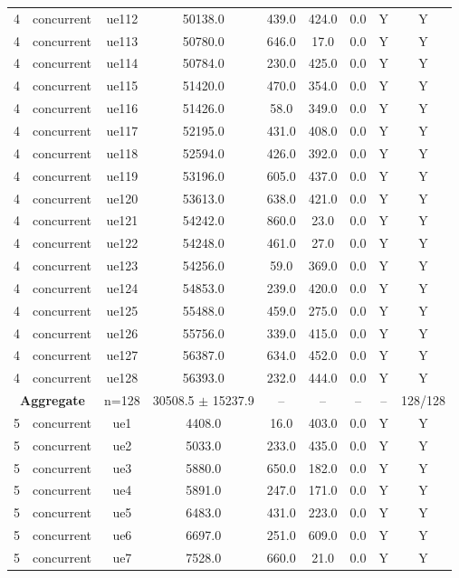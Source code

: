 \begin{table}[ht]
\begin{tabular}{|c|c|c|c|c|c|c|c|c|}
4 & concurrent & ue112 & 50138.0 & 439.0 & 424.0 & 0.0 & Y & Y \\
4 & concurrent & ue113 & 50780.0 & 646.0 & 17.0 & 0.0 & Y & Y \\
4 & concurrent & ue114 & 50784.0 & 230.0 & 425.0 & 0.0 & Y & Y \\
4 & concurrent & ue115 & 51420.0 & 470.0 & 354.0 & 0.0 & Y & Y \\
4 & concurrent & ue116 & 51426.0 & 58.0 & 349.0 & 0.0 & Y & Y \\
4 & concurrent & ue117 & 52195.0 & 431.0 & 408.0 & 0.0 & Y & Y \\
4 & concurrent & ue118 & 52594.0 & 426.0 & 392.0 & 0.0 & Y & Y \\
4 & concurrent & ue119 & 53196.0 & 605.0 & 437.0 & 0.0 & Y & Y \\
4 & concurrent & ue120 & 53613.0 & 638.0 & 421.0 & 0.0 & Y & Y \\
4 & concurrent & ue121 & 54242.0 & 860.0 & 23.0 & 0.0 & Y & Y \\
4 & concurrent & ue122 & 54248.0 & 461.0 & 27.0 & 0.0 & Y & Y \\
4 & concurrent & ue123 & 54256.0 & 59.0 & 369.0 & 0.0 & Y & Y \\
4 & concurrent & ue124 & 54853.0 & 239.0 & 420.0 & 0.0 & Y & Y \\
4 & concurrent & ue125 & 55488.0 & 459.0 & 275.0 & 0.0 & Y & Y \\
4 & concurrent & ue126 & 55756.0 & 339.0 & 415.0 & 0.0 & Y & Y \\
4 & concurrent & ue127 & 56387.0 & 634.0 & 452.0 & 0.0 & Y & Y \\
4 & concurrent & ue128 & 56393.0 & 232.0 & 444.0 & 0.0 & Y & Y \\
\multicolumn{2}{|c|}{\textbf{Aggregate}} & n=128 & 30508.5 $\pm$ 15237.9 & -- & -- & -- & -- & 128/128 \\
\hline
5 & concurrent & ue1 & 4408.0 & 16.0 & 403.0 & 0.0 & Y & Y \\
5 & concurrent & ue2 & 5033.0 & 233.0 & 435.0 & 0.0 & Y & Y \\
5 & concurrent & ue3 & 5880.0 & 650.0 & 182.0 & 0.0 & Y & Y \\
5 & concurrent & ue4 & 5891.0 & 247.0 & 171.0 & 0.0 & Y & Y \\
5 & concurrent & ue5 & 6483.0 & 431.0 & 223.0 & 0.0 & Y & Y \\
5 & concurrent & ue6 & 6697.0 & 251.0 & 609.0 & 0.0 & Y & Y \\
5 & concurrent & ue7 & 7528.0 & 660.0 & 21.0 & 0.0 & Y & Y \\

\end{tabular}
\end{table}
